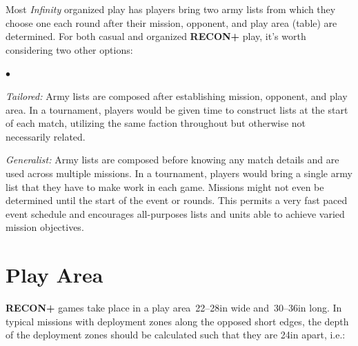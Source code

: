 \documentclass[14pt,dvipsnames]{extarticle}
\newenvironment{squishitemize}
{\begin{list}{$\bullet$}{%
    \setlength{\itemsep}{2pt}%
    \setlength{\parsep}{2pt}%
    \setlength{\topsep}{2pt}%
    \setlength{\parskip}{0pt} %
    \renewcommand{\labelitemi}{--}}}
  {\end{list}}
\newcommand{\reconplus}{\textbf{RECON+}\xspace}
\begin{document}
Most \emph{Infinity} organized play has players bring two army lists
from which they choose one each round after their mission, opponent,
and play area (table) are determined.  For both casual and organized
\reconplus play, it's worth considering two other options:
\begin{squishitemize}
  \item \emph{Tailored:} Army lists are composed after establishing
    mission, opponent, and play area. In a tournament, players would
    be given time to construct lists at the start of each match,
    utilizing the same faction throughout but otherwise not
    necessarily related.

  \item \emph{Generalist:} Army lists are composed before knowing any
    match details and are used across multiple missions. In a
    tournament, players would bring a single army list that they have
    to make work in each game.  Missions might not even be determined
    until the start of the event or rounds.  This permits a very fast
    paced event schedule and encourages all-purposes lists and units
    able to achieve varied mission objectives.

\end{squishitemize}

%
%
%
%


\section{Play Area}

\reconplus games take place in a play area~22--28in wide and~30--36in
long.  In typical missions with deployment zones along the opposed
short edges, the depth of the deployment zones should be calculated
such that they are 24in apart, i.e.:
\end{document}
